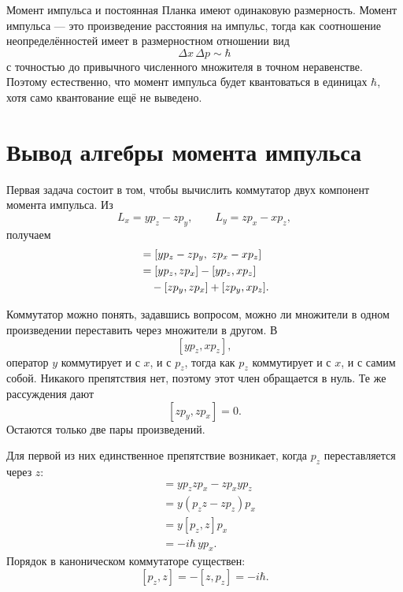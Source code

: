 Момент импульса и постоянная Планка имеют одинаковую размерность. Момент импульса — это произведение расстояния на импульс, тогда как соотношение неопределённостей имеет в размерностном отношении вид \begin{equation}
\Delta x\,\Delta p\sim\hbar
\end{equation} с точностью до привычного численного множителя в точном неравенстве. Поэтому естественно, что момент импульса будет квантоваться в единицах \(\hbar\), хотя само квантование ещё не выведено.

\section{Вывод алгебры момента импульса}

Первая задача состоит в том, чтобы вычислить коммутатор двух компонент момента импульса. Из \[
L_x=yp_z-zp_y,\qquad
L_y=zp_x-xp_z,
\] получаем \begin{align}
[L_x,L_y]
&=[yp_z-zp_y,\;zp_x-xp_z] \\
&=[yp_z,zp_x]-[yp_z,xp_z] \notag\\
&\quad{}-[zp_y,zp_x]+[zp_y,xp_z].
\end{align}

\begin{classroomqa}    \end{classroomqa}

Коммутатор можно понять, задавшись вопросом, можно ли множители в одном произведении переставить через множители в другом. В \[
[yp_z,xp_z],
\] оператор \(y\) коммутирует и с \(x\), и с \(p_z\), тогда как \(p_z\) коммутирует и с \(x\), и с самим собой. Никакого препятствия нет, поэтому этот член обращается в нуль. Те же рассуждения дают \[
[zp_y,zp_x]=0.
\] Остаются только две пары произведений.

Для первой из них единственное препятствие возникает, когда \(p_z\) переставляется через \(z\): \begin{align}
[yp_z,zp_x]
&=yp_zzp_x-zp_xyp_z \\
&=y(p_zz-zp_z)p_x \\
&=y[p_z,z]p_x \\
&=-i\hbar\,yp_x.
\end{align} Порядок в каноническом коммутаторе существен: \[
[p_z,z]=-[z,p_z]=-i\hbar.
\]

